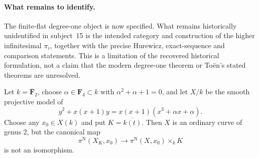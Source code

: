 \paragraph{What remains to identify.}
The finite-flat degree-one object is now specified.  What remains
historically unidentified in subject~15 is the intended category
and construction of the higher infinitesimal $\pi_i$, together with
the precise Hurewicz, exact-sequence and comparison statements.
This is a limitation of the recovered historical formulation,
not a claim that the modern degree-one theorem or To\"en's stated
theorems are unresolved.

\begin{proposition}\label{B:nori-base-change-counterexample}
Let $k=\overline{\mathbf F}_2$, choose
$\alpha\in\mathbf F_4\subset k$ with $\alpha^2+\alpha+1=0$,
and let $X/k$ be the smooth projective model of
\[
 y^2+x(x+1)y=x(x+1)(x^3+\alpha x+\alpha).
\]
Choose any $x_0\in X(k)$ and put $K=\overline{k(t)}$.
Then $X$ is an ordinary curve of genus $2$, but the canonical map
\[
 \pi^{\mathrm N}(X_K,x_0)\longrightarrow
 \pi^{\mathrm N}(X,x_0)\times_k K
\]
is not an isomorphism.
\end{proposition}

